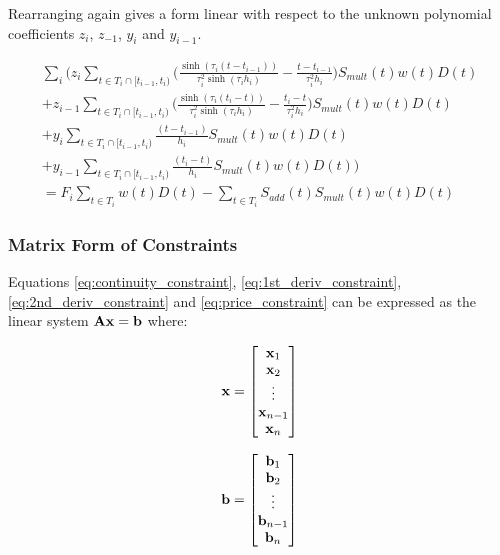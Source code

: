 \documentclass{article}
\begin{document}
Rearranging again gives a form linear with respect to the unknown polynomial coefficients
$z_i$, $z_{-1}$, $y_i$ and $y_{i-1}$.

\begin{multline}
    \sum_i \biggl(  z_i \sum_{t \in T_i \cap [t_{i-1}, t_i)} \biggl( \frac{\sinh(\tau_i (t - t_{i-1}))}{\tau_i^2 \sinh(\tau_i h_i)} 
      - \frac{t - t_{i-1}}{\tau_i^2 h_i} \biggr) S_{mult}(t)w(t)D(t) \\
    + z_{i-1} \sum_{t \in T_i \cap [t_{i-1}, t_i)} \biggl( \frac{\sinh(\tau_i (t_i - t))}{\tau_i^2 \sinh(\tau_i h_i)} 
     - \frac{t_i - t}{\tau_i^2 h_i} \biggr) S_{mult}(t)w(t)D(t) \\
    + y_i \sum_{t \in T_i \cap [t_{i-1}, t_i)} \frac{(t - t_{i-1})}{h_i} S_{mult}(t)w(t)D(t) \\
    + y_{i-1} \sum_{t \in T_i \cap [t_{i-1}, t_i)} \frac{(t_i - t)}{h_i} S_{mult}(t)w(t)D(t) \biggr) \\
    = F_i \sum_{t \in T_i} w(t)D(t) - \sum_{t \in T_i} S_{add}(t) S_{mult}(t)w(t)D(t)
\end{multline}


\subsubsection{Matrix Form of Constraints}
Equations \ref{eq:continuity_constraint}, \ref{eq:1st_deriv_constraint}, \ref{eq:2nd_deriv_constraint} and
 \ref{eq:price_constraint} can be expressed as the linear system $\mathbf{Ax = b}$ where:

\begin{equation*}
    \mathbf{x} = \begin{bmatrix}
        \mathbf{x}_1 \\
        \mathbf{x}_2 \\
        \vdots \\
        \mathbf{x}_{n-1} \\
        \mathbf{x}_n \\
    \end{bmatrix}
\end{equation*}

\begin{equation*}
    \mathbf{b} = \begin{bmatrix}
        \mathbf{b}_1 \\
        \mathbf{b}_2 \\
        \vdots \\
        \mathbf{b}_{n-1} \\
        \mathbf{b}_n \\
    \end{bmatrix}
\end{equation*}
\end{document}
